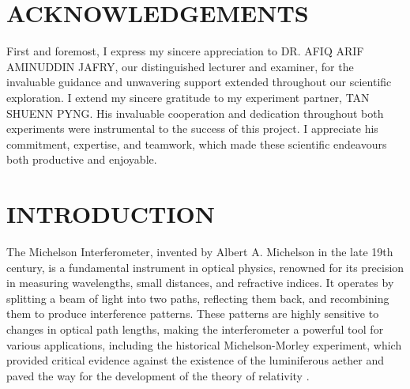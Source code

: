 \documentclass[a4paper,11pt]{article}
\begin{document}
\newpage 
{}
\section*{\large \center ACKNOWLEDGEMENTS}
\label{sec:ACKNOWLEDGEMENTS}

\qquad First and foremost, I express my sincere appreciation to DR. AFIQ ARIF AMINUDDIN JAFRY, our distinguished lecturer and examiner, for the invaluable guidance and unwavering support extended throughout our scientific exploration. I extend my sincere gratitude to my experiment partner, TAN SHUENN PYNG. His invaluable cooperation and dedication throughout both experiments were instrumental to the success of this project. I appreciate his commitment, expertise, and teamwork, which made these scientific endeavours both productive and enjoyable.

\newpage
\renewcommand{\contentsname}{CONTENTS}
\renewcommand{\cftsecleader}{\cftdotfill{\cftdotsep}} %
\renewcommand{\cftdotsep}{1.0} %
\begin{center}
\tableofcontents
\end{center}
\label{sec:CONTENTS}

\newpage
\renewcommand{\listtablename}{LIST OF TABLES}
{}
\label{sec:LIST OF TABLES}
\begin{center}
\listoftables
\end{center}

\newpage
\renewcommand{\listfigurename}{LIST OF FIGURES}
{}
\label{sec:LIST OF FIGURES}
\begin{center}
\listoffigures
\end{center}

\newpage
{} 
\section{\centering INTRODUCTION}
\label{sec:INTRODUCTION}

\indent

The Michelson Interferometer, invented by Albert A. Michelson in the late 19th century, is a fundamental instrument in optical physics, renowned for its precision in measuring wavelengths, small distances, and refractive indices. It operates by splitting a beam of light into two paths, reflecting them back, and recombining them to produce interference patterns. These patterns are highly sensitive to changes in optical path lengths, making the interferometer a powerful tool for various applications, including the historical Michelson-Morley experiment, which provided critical evidence against the existence of the luminiferous aether and paved the way for the development of the theory of relativity \cite{michelson_morley_1887}.
\end{document}
